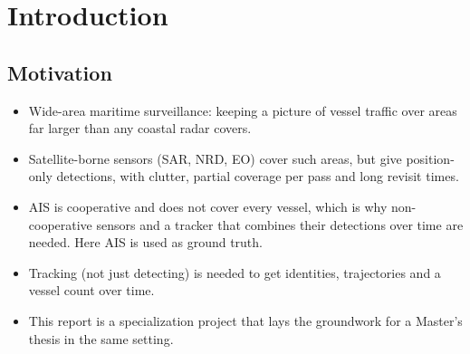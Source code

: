 \section{Introduction}
\label{sec:introduction}

\subsection{Motivation}
\label{sec:motivation}
\begin{itemize}
    \item Wide-area maritime surveillance: keeping a picture of vessel traffic over areas far larger than any coastal radar covers.
    \item Satellite-borne sensors (SAR, NRD, EO) cover such areas, but give position-only detections, with clutter, partial coverage per pass and long revisit times.
    \item AIS is cooperative and does not cover every vessel, which is why non-cooperative sensors and a tracker that combines their detections over time are needed. Here AIS is used as ground truth.
    \item Tracking (not just detecting) is needed to get identities, trajectories and a vessel count over time.
    \item This report is a specialization project that lays the groundwork for a Master's thesis in the same setting.
\end{itemize}

